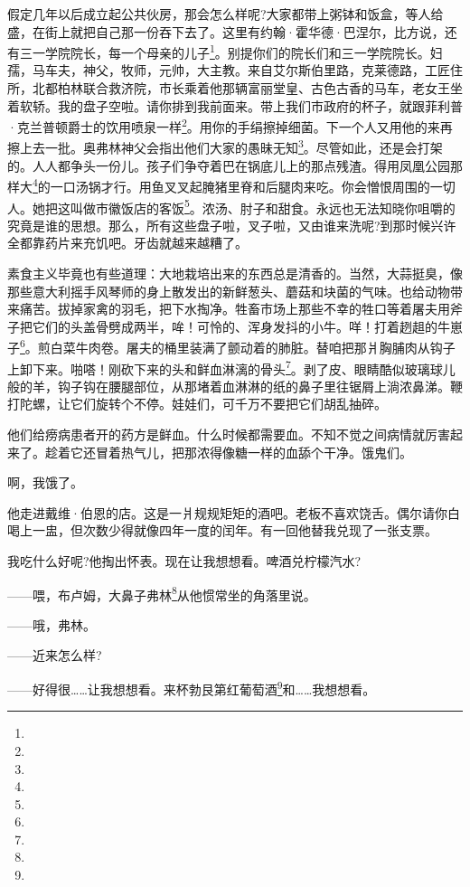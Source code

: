 \par 假定几年以后成立起公共伙房，那会怎么样呢?大家都带上粥钵和饭盒，等人给盛，在街上就把自己那一份吞下去了。这里有约翰·霍华德·巴涅尔，比方说，还有三一学院院长，每一个母亲的儿子\footnote{}。别提你们的院长们和三一学院院长。妇孺，马车夫，神父，牧师，元帅，大主教。来自艾尔斯伯里路，克莱德路，工匠住所，北都柏林联合救济院，市长乘着他那辆富丽堂皇、古色古香的马车，老女王坐着软轿。我的盘子空啦。请你排到我前面来。带上我们市政府的杯子，就跟菲利普·克兰普顿爵士的饮用喷泉一样\footnote{}。用你的手绢擦掉细菌。下一个人又用他的来再擦上去一批。奥弗林神父会指出他们大家的愚昧无知\footnote{}。尽管如此，还是会打架的。人人都争头一份儿。孩子们争夺着巴在锅底儿上的那点残渣。得用凤凰公园那样大\footnote{}的一口汤锅才行。用鱼叉叉起腌猪里脊和后腿肉来吃。你会憎恨周围的一切人。她把这叫做市徽饭店的客饭\footnote{}。浓汤、肘子和甜食。永远也无法知晓你咀嚼的究竟是谁的思想。那么，所有这些盘子啦，叉子啦，又由谁来洗呢?到那时候兴许全都靠药片来充饥吧。牙齿就越来越糟了。
\par 素食主义毕竟也有些道理：大地栽培出来的东西总是清香的。当然，大蒜挺臭，像那些意大利摇手风琴师的身上散发出的新鲜葱头、蘑菇和块菌的气味。也给动物带来痛苦。拔掉家禽的羽毛，把下水掏净。牲畜市场上那些不幸的牲口等着屠夫用斧子把它们的头盖骨劈成两半，哞！可怜的、浑身发抖的小牛。咩！打着趔趄的牛崽子\footnote{}。煎白菜牛肉卷。屠夫的桶里装满了颤动着的肺脏。替咱把那爿胸脯肉从钩子上卸下来。啪嗒！刚砍下来的头和鲜血淋漓的骨头\footnote{}。剥了皮、眼睛酷似玻璃球儿般的羊，钩子钩在腰腿部位，从那堵着血淋淋的纸的鼻子里往锯屑上淌浓鼻涕。鞭打陀螺，让它们旋转个不停。娃娃们，可千万不要把它们胡乱抽碎。
\par 他们给痨病患者开的药方是鲜血。什么时候都需要血。不知不觉之间病情就厉害起来了。趁着它还冒着热气儿，把那浓得像糖一样的血舔个干净。饿鬼们。
\par 啊，我饿了。
\par 他走进戴维·伯恩的店。这是一爿规规矩矩的酒吧。老板不喜欢饶舌。偶尔请你白喝上一盅，但次数少得就像四年一度的闰年。有一回他替我兑现了一张支票。
\par 我吃什么好呢?他掏出怀表。现在让我想想看。啤酒兑柠檬汽水?
\par ——喂，布卢姆，大鼻子弗林\footnote{}从他惯常坐的角落里说。
\par ——哦，弗林。
\par ——近来怎么样?
\par ——好得很……让我想想看。来杯勃艮第红葡萄酒\footnote{}和……我想想看。
